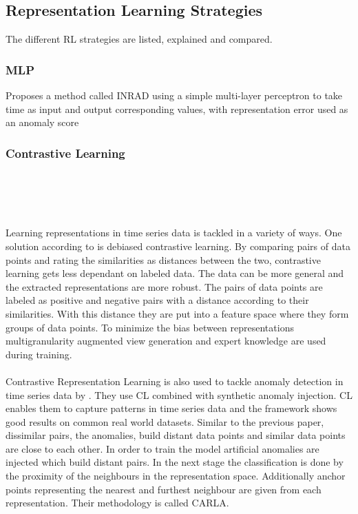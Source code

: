 \subsection{Representation Learning Strategies}
The different RL strategies are listed, explained and compared.\\
\subsubsection{MLP}
Proposes a method called INRAD using a simple multi-layer perceptron to take time as input and output corresponding values, with representation error used as an anomaly score
\cite{jeong_time-series_2022}
\subsubsection{Contrastive Learning}
\cite{ngu_cl-tad_2023}\\\\%
\cite{lee_time_2023}\\\\%
Learning representations in time series data is tackled in a variety of ways. One solution according to  is debiased contrastive learning. By comparing pairs of data points and rating the similarities as distances between the two, contrastive learning gets less dependant on labeled data. The data can be more general and the extracted representations are more robust. The pairs of data points are labeled as positive and negative pairs with a distance according to their similarities. With this distance they are put into a feature space where they form groups of data points. To minimize the bias between representations multigranularity augmented view generation and expert knowledge are used during training. \\\\
Contrastive Representation Learning is also used to tackle anomaly detection in time series data by . They use CL combined with synthetic anomaly injection. CL enables them to capture patterns in time series data and the framework shows good results on common real world datasets. Similar to the previous paper, dissimilar pairs, the anomalies, build distant data points and similar data points are close to each other. In order to train the model artificial anomalies are injected which build distant pairs. In the next stage the classification is done by  the proximity of the neighbours in the representation space. Additionally anchor points representing the nearest and furthest neighbour are given from each representation. Their methodology is called CARLA.\\\\
